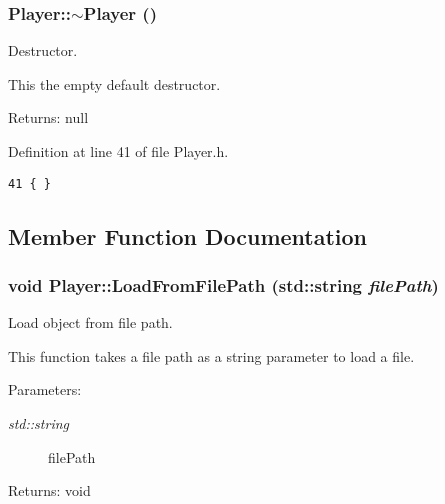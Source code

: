 \hypertarget{class_player_749d2c00e1fe0f5c2746f7505a58c062}{
\subsubsection[$\sim$Player]{\setlength{\rightskip}{0pt plus 5cm}Player::$\sim$Player ()}}
\label{class_player_749d2c00e1fe0f5c2746f7505a58c062}


Destructor. 

This the empty default destructor.

\begin{Desc}
\item[Returns:]null \end{Desc}


Definition at line 41 of file Player.h.

\begin{Code}\begin{verbatim}41 { }
\end{verbatim}
\end{Code}




\subsection{Member Function Documentation}
\hypertarget{class_player_394737f2360c0e14e21401044ffe74ff}{
\subsubsection[LoadFromFilePath]{\setlength{\rightskip}{0pt plus 5cm}void Player::LoadFromFilePath (std::string {\em filePath})}}
\label{class_player_394737f2360c0e14e21401044ffe74ff}


Load object from file path. 

This function takes a file path as a string parameter to load a file.

\begin{Desc}
\item[Parameters:]
\begin{description}
\item[{\em std::string}]filePath \end{description}
\end{Desc}
\begin{Desc}
\item[Returns:]void \end{Desc}



